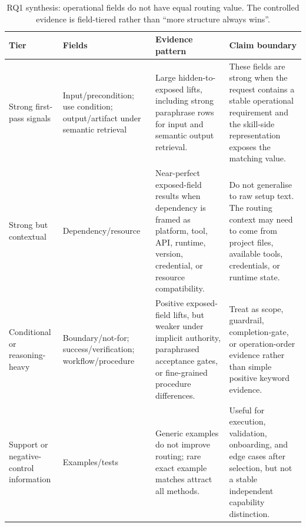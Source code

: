 \begin{table}[H]
\centering
\scriptsize
\setlength{\tabcolsep}{2pt}
\begin{tabular}{p{}p{}p{}p{}}
\toprule
Tier & Fields & Evidence pattern & Claim boundary \\
\midrule
Strong first-pass signals & Input/precondition; use condition; output/artifact under semantic retrieval & Large hidden-to-exposed lifts, including strong paraphrase rows for input and semantic output retrieval. & These fields are strong when the request contains a stable operational requirement and the skill-side representation exposes the matching value. \\
Strong but contextual & Dependency/resource & Near-perfect exposed-field results when dependency is framed as platform, tool, API, runtime, version, credential, or resource compatibility. & Do not generalise to raw setup text. The routing context may need to come from project files, available tools, credentials, or runtime state. \\
Conditional or reasoning-heavy & Boundary/not-for; success/verification; workflow/procedure & Positive exposed-field lifts, but weaker under implicit authority, paraphrased acceptance gates, or fine-grained procedure differences. & Treat as scope, guardrail, completion-gate, or operation-order evidence rather than simple positive keyword evidence. \\
Support or negative-control information & Examples/tests & Generic examples do not improve routing; rare exact example matches attract all methods. & Useful for execution, validation, onboarding, and edge cases after selection, but not a stable independent capability distinction. \\
\bottomrule
\end{tabular}
\caption{RQ1 synthesis: operational fields do not have equal routing value. The controlled evidence is field-tiered rather than ``more structure always wins''.}
\label{tab:rq1-field-tier-synthesis}
\end{table}

